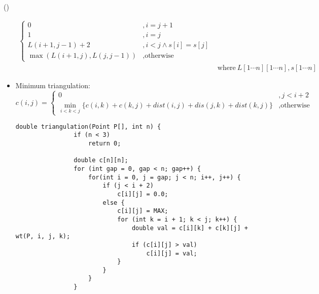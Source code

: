 \begin{theorem}{()}
\begin{itemize}
\begin{equation}
\begin{aligned}
\begin{cases}
                    0 &, i = j + 1 \\
                    1 &, i = j \\
                    L(i + 1, j - 1) + 2 &, i < j \land s[i] = s[j] \\
                    \max(L(i + 1, j), L(j, j - 1)) &, \text{otherwise}
                \end{cases} \\
                & \text{where} \ L[1 \cdots n][1 \cdots n], s[1 \cdots n]
            \end{aligned}
        \end{equation}
        \item Minimum triangulation: \begin{equation}
            c(i, j) = \begin{cases}
                0 &, j < i + 2 \\
                \min_{i < k < j}\{c(i, k) + c(k, j) + dist(i, j) + dis(j, k) + dist(k, j)\} &, \text{otherwise}
            \end{cases}
        \end{equation} \begin{lstlisting}[caption={Minimum triangulation.}, captionpos=b]
            double triangulation(Point P[], int n) {
                if (n < 3)
                    return 0;
                
                double c[n][n];
                for (int gap = 0, gap < n; gap++) {
                    for(int i = 0, j = gap; j < n; i++, j++) {
                        if (j < i + 2)
                            c[i][j] = 0.0;
                        else {
                            c[i][j] = MAX;
                            for (int k = i + 1; k < j; k++) {
                                double val = c[i][k] + c[k][j] + wt(P, i, j, k);
                                if (c[i][j] > val)
                                    c[i][j] = val;
                            }
                        }
                    }
                }


\end{lstlisting}
\end{itemize}
\end{theorem}
